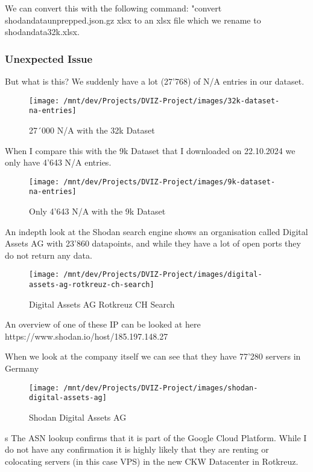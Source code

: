 \documentclass[11pt,a4paper]{article}
\begin{document}
\begin{data}
We can convert this with the following command: "convert shodan\textbf{\textunderscore}data\textbf{\textunderscore}unprepped.json.gz xlsx to an xlsx file which we rename to shodan\textbf{\textunderscore}data\textbf{\textunderscore}32k.xlsx.


\newpage
\subsubsection{Unexpected Issue}
But what is this? We suddenly have a lot  (27'768) of N/A entries in our dataset.

\begin{figure}[h!]
    \centering
    \texttt{[image: /mnt/dev/Projects/DVIZ-Project/images/32k-dataset-na-entries]}
    \caption{27´000 N/A with the 32k Dataset}
    \label{fig:32k-dataset-na-entries}
\end{figure}

When I compare this with the 9k Dataset that I downloaded on 22.10.2024 we only have 4'643 N/A entries.

\begin{figure}[h!]
    \centering
    \texttt{[image: /mnt/dev/Projects/DVIZ-Project/images/9k-dataset-na-entries]}
    \caption{Only 4'643 N/A with the 9k Dataset}
    \label{fig:9k-dataset-na-entries}
\end{figure}

\newpage

An indepth look at the Shodan search engine shows an organisation called Digital Assets AG with 23'860 datapoints, and
while they have a lot of open ports they do not return any data.

\begin{figure}[h!]
    \centering
    \texttt{[image: /mnt/dev/Projects/DVIZ-Project/images/digital-assets-ag-rotkreuz-ch-search]}
    \caption{Digital Assets AG Rotkreuz CH Search}
    \label{fig:digital-assets-ag-rotkreuz-ch-search}
\end{figure}

An overview of one of these IP can be looked at here https://www.shodan.io/host/185.197.148.27


When we look at the company itself we can see that they have 77'280 servers in Germany

\begin{figure}[h!]
    \centering
    \texttt{[image: /mnt/dev/Projects/DVIZ-Project/images/shodan-digital-assets-ag]}
    \caption{Shodan Digital Assets AG}
    \label{fig:shodan-digital-assets-ag}
\end{figure}
s
The ASN lookup confirms that it is part of the Google Cloud Platform. While I do not have any confirmation it is highly likely that
they are renting or colocating servers (in this case VPS) in the new CKW Datacenter in Rotkreuz.


\end{data}
\end{document}
